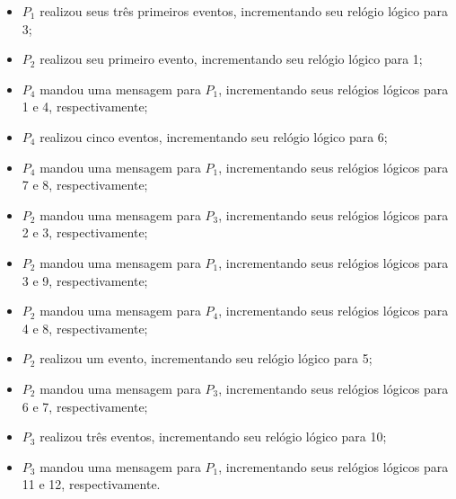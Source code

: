 \documentclass[conference]{IEEEtran}
\begin{document}
\begin{itemize}
\item $P_1$ realizou seus três primeiros eventos, incrementando seu relógio lógico para 3;
\item $P_2$ realizou seu primeiro evento, incrementando seu relógio lógico para 1;
\item $P_4$ mandou uma mensagem para $P_1$, incrementando seus relógios lógicos para 1 e 4, respectivamente;
\item $P_4$ realizou cinco eventos, incrementando seu relógio lógico para 6;
\item $P_4$ mandou uma mensagem para $P_1$, incrementando seus relógios lógicos para 7 e 8, respectivamente;
\item $P_2$ mandou uma mensagem para $P_3$, incrementando seus relógios lógicos para 2 e 3, respectivamente;
\item $P_2$ mandou uma mensagem para $P_1$, incrementando seus relógios lógicos para 3 e 9, respectivamente;
\item $P_2$ mandou uma mensagem para $P_4$, incrementando seus relógios lógicos para 4 e 8, respectivamente;
\item $P_2$ realizou um evento, incrementando seu relógio lógico para 5;
\item $P_2$ mandou uma mensagem para $P_3$, incrementando seus relógios lógicos para 6 e 7, respectivamente;
\item $P_3$ realizou três eventos, incrementando seu relógio lógico para 10;
\item $P_3$ mandou uma mensagem para $P_1$, incrementando seus relógios lógicos para 11 e 12, respectivamente.
\end{itemize}
\end{document}
